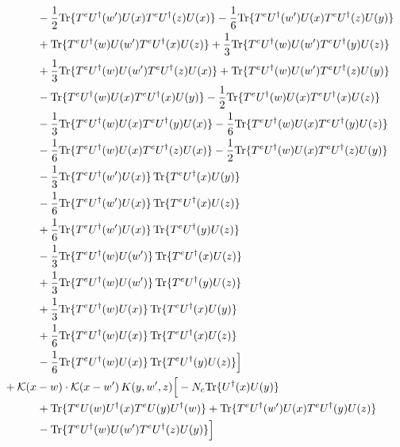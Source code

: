\documentclass[10pt]{article}
\numberwithin{equation}{section}
\begin{document}
\begin{align}
&\quad\quad\quad-\frac{1}{2}{\rm Tr}\{T^eU^\dagger(w')U(x)T^eU^\dagger(z)U(x)\}-\frac{1}{6}{\rm Tr}\{T^eU^\dagger(w')U(x)T^eU^\dagger(z)U(y)\}\notag\\
&\quad\quad\quad+{\rm Tr}\{T^eU^\dagger(w)U(w')T^eU^\dagger(x)U(z)\}+\frac{1}{3}{\rm Tr}\{T^eU^\dagger(w)U(w')T^eU^\dagger(y)U(z)\}\notag\\
&\quad\quad\quad+\frac{1}{3}{\rm Tr}\{T^eU^\dagger(w)U(w')T^eU^\dagger(z)U(x)\}+{\rm Tr}\{T^eU^\dagger(w)U(w')T^eU^\dagger(z)U(y)\}\notag\\
&\quad\quad\quad-{\rm Tr}\{T^eU^\dagger(w)U(x)T^eU^\dagger(x)U(y)\}-\frac{1}{2}{\rm Tr}\{T^eU^\dagger(w)U(x)T^eU^\dagger(x)U(z)\}\notag\\
&\quad\quad\quad-\frac{1}{3}{\rm Tr}\{T^eU^\dagger(w)U(x)T^eU^\dagger(y)U(x)\}-\frac{1}{6}{\rm Tr}\{T^eU^\dagger(w)U(x)T^eU^\dagger(y)U(z)\}\notag\\
&\quad\quad\quad-\frac{1}{6}{\rm Tr}\{T^eU^\dagger(w)U(x)T^eU^\dagger(z)U(x)\}-\frac{1}{2}{\rm Tr}\{T^eU^\dagger(w)U(x)T^eU^\dagger(z)U(y)\}\notag\\
&\quad\quad\quad-\frac{1}{3}{\rm Tr}\{T^eU^\dagger(w')U(x)\}\,{\rm Tr}\{T^eU^\dagger(x)U(y)\}\notag\\
&\quad\quad\quad-\frac{1}{6}{\rm Tr}\{T^eU^\dagger(w')U(x)\}\,{\rm Tr}\{T^eU^\dagger(x)U(z)\}\notag\\
&\quad\quad\quad+\frac{1}{6}{\rm Tr}\{T^eU^\dagger(w')U(x)\}\,{\rm Tr}\{T^eU^\dagger(y)U(z)\}\notag\\
&\quad\quad\quad-\frac{1}{3}{\rm Tr}\{T^eU^\dagger(w)U(w')\}\,{\rm Tr}\{T^eU^\dagger(x)U(z)\}\notag\\
&\quad\quad\quad+\frac{1}{3}{\rm Tr}\{T^eU^\dagger(w)U(w')\}\,{\rm Tr}\{T^eU^\dagger(y)U(z)\}\notag\\
&\quad\quad\quad+\frac{1}{3}{\rm Tr}\{T^eU^\dagger(w)U(x)\}\,{\rm Tr}\{T^eU^\dagger(x)U(y)\}\notag\\
&\quad\quad\quad+\frac{1}{6}{\rm Tr}\{T^eU^\dagger(w)U(x)\}\,{\rm Tr}\{T^eU^\dagger(x)U(z)\}\notag\\
&\quad\quad\quad-\frac{1}{6}{\rm Tr}\{T^eU^\dagger(w)U(x)\}\,{\rm Tr}\{T^eU^\dagger(y)U(z)\}\Big]\notag\\
&+\mathcal K(x-w)\cdot\mathcal K(x-w')\,K(y,w',z)\Big[-N_c{\rm Tr}\{U^\dagger(x)U(y)\}\notag\\
&\quad\quad\quad+{\rm Tr}\{T^eU(w)U^\dagger(x)T^eU(y)U^\dagger(w)\}+{\rm Tr}\{T^eU^\dagger(w')U(x)T^eU^\dagger(y)U(z)\}\notag\\
&\quad\quad\quad-{\rm Tr}\{T^eU^\dagger(w)U(w')T^eU^\dagger(z)U(y)\}\Big]\notag\\

\end{align}
\end{document}
